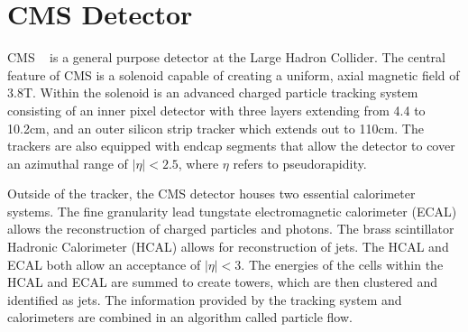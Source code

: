 \section{CMS Detector}
\label{sec:cms_detector}
CMS ~\cite{cmsexp} is a general purpose detector at the Large Hadron Collider.  The central 
feature of CMS is a solenoid capable of creating a uniform, axial magnetic field of 
3.8T.  Within the solenoid is an advanced charged particle tracking system consisting 
of an inner pixel detector with three layers extending from 4.4 to 10.2cm, and an 
outer silicon strip tracker which extends out to 110cm.  The trackers are also equipped 
with endcap segments that allow the detector to cover an azimuthal range of 
$|\eta| < 2.5$, where $\eta$ refers to  pseudorapidity. 
 
Outside of the tracker, the CMS detector houses two essential calorimeter systems.  
The fine granularity lead tungstate electromagnetic calorimeter (ECAL) allows the 
reconstruction of charged particles and photons.  The brass scintillator Hadronic 
Calorimeter (HCAL) allows for reconstruction of jets.  The HCAL and ECAL both allow an 
acceptance of $|\eta| < 3$.  The energies of the cells within the HCAL and ECAL are summed 
to create towers, which are then clustered and identified as jets.  The information provided 
by the tracking system and calorimeters are combined in an algorithm called particle flow.
